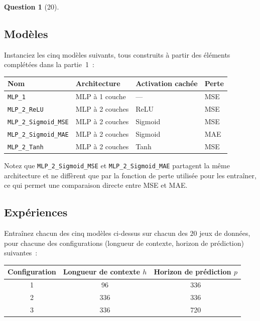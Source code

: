 \documentclass[12pt]{article}
\theoremstyle{definition}
\newtheorem{exercise}{Question}
\begin{document}
\begin{exercise}[20]
{\subsection*{Modèles}

Instanciez les cinq modèles suivants, tous construits à partir des éléments complétées dans la
partie~1~:

\begin{center}
\begin{tabular}{@{}llll@{}}
\toprule
\textbf{Nom} & \textbf{Architecture} & \textbf{Activation cachée} & \textbf{Perte} \\
\midrule
\texttt{MLP\_1}              & MLP à 1 couche & --- & MSE \\
\texttt{MLP\_2\_ReLU}        & MLP à 2 couches & ReLU & MSE \\
\texttt{MLP\_2\_Sigmoid\_MSE} & MLP à 2 couches & Sigmoid & MSE \\
\texttt{MLP\_2\_Sigmoid\_MAE} & MLP à 2 couches & Sigmoid & MAE \\
\texttt{MLP\_2\_Tanh}        & MLP à 2 couches & Tanh & MSE \\
\bottomrule
\end{tabular}
\end{center}

\noindent Notez que \texttt{MLP\_2\_Sigmoid\_MSE} et \texttt{MLP\_2\_Sigmoid\_MAE} partagent la
même architecture et ne diffèrent que par la fonction de perte utilisée pour les entraîner, ce
qui permet une comparaison directe entre MSE et MAE.

\subsection*{Expériences}

Entraînez chacun des cinq modèles ci-dessus sur chacun des $20$ jeux de données, pour chacune
des configurations (longueur de contexte, horizon de prédiction) suivantes~:

\begin{center}
\begin{tabular}{@{}ccc@{}}
\toprule
\textbf{Configuration} & \textbf{Longueur de contexte $h$} & \textbf{Horizon de prédiction $p$} \\
\midrule
1 & 96  & 336 \\
2 & 336 & 336 \\
3 & 336 & 720 \\
\bottomrule
\end{tabular}
\end{center}

}
\end{exercise}
\end{document}
